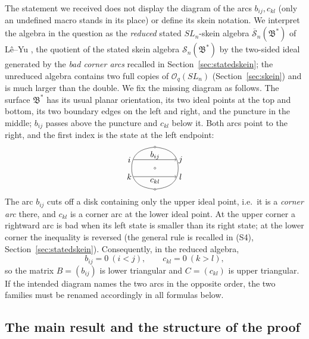 \documentclass[12pt]{article}
\theoremstyle{remark}
\newcommand{\Skein}{\mathcal S_n}
\newcommand{\redS}{\overline{\mathcal S}_n}
\newcommand{\Bstar}{\mathfrak B^*}
\newcommand{\Oq}{\mathcal O_q(SL_n)}
\begin{document}
The statement we received does not display the diagram of the arcs
$b_{ij},c_{kl}$ (only an undefined macro stands in its place) or
define its skein notation. We interpret the algebra in the question as
the \emph{reduced} stated $SL_n$-skein algebra $\redS(\Bstar)$ of
L\^e--Yu \cite[Section 7.1]{LY}, the quotient of the stated skein
algebra $\Skein(\Bstar)$ by the two-sided ideal generated by the
\emph{bad corner arcs} recalled in Section~\ref{sec:statedskein}; the
unreduced algebra contains two full copies of $\Oq$
(Section~\ref{sec:skein}) and is much larger than the double.
We fix the missing diagram as follows. The surface $\Bstar$ has its
usual planar orientation, its two ideal points at the top and bottom,
its two boundary edges on the left and right, and the puncture in the
middle; $b_{ij}$ passes above the puncture and $c_{kl}$ below it. Both
arcs point to the right, and the first index is the state at the left
endpoint:
\[
\begin{tikzpicture}[baseline=0,scale=0.6]
  \draw (-1.65,0) .. controls (-1.65,1.25) and (-0.7,1.4) .. (0,1.5);
  \draw (0,1.5) .. controls (0.7,1.4) and (1.65,1.25) .. (1.65,0);
  \draw (-1.65,0) .. controls (-1.65,-1.25) and (-0.7,-1.4) .. (0,-1.5);
  \draw (0,-1.5) .. controls (0.7,-1.4) and (1.65,-1.25) .. (1.65,0);
  \filldraw[fill=white] (0,1.5) circle (0.06);
  \filldraw[fill=white] (0,-1.5) circle (0.06);
  \filldraw[fill=white] (0,0) circle (0.065);
  \draw[->] (-1.52,0.6) -- (1.52,0.6);
  \draw[->] (-1.52,-0.6) -- (1.52,-0.6);
  \node at (-1.82,0.6) {$i$};
  \node at (1.82,0.6) {$j$};
  \node at (-1.82,-0.6) {$k$};
  \node at (1.82,-0.6) {$l$};
  \node at (0,0.91) {$b_{ij}$};
  \node at (0,-0.91) {$c_{kl}$};
\end{tikzpicture}
\]
The arc $b_{ij}$ cuts off a disk containing only the upper ideal
point, i.e.\ it is a \emph{corner arc} there, and $c_{kl}$ is a corner
arc at the lower ideal point. At the upper corner a rightward arc
is bad when its left state is smaller than its right state; at the
lower corner the inequality is reversed (the general rule is recalled
in (S4), Section~\ref{sec:statedskein}). Consequently, in the reduced
algebra,
\[
 b_{ij}=0\ (i<j),\qquad c_{kl}=0\ (k>l),
\]
so the matrix $B=(b_{ij})$ is lower triangular and $C=(c_{kl})$ is
upper triangular. If the intended diagram names the two arcs in the
opposite order, the two families must be renamed accordingly in all
formulas below.

\subsection{The main result and the structure of the proof}\label{sec:strategy}
\end{document}
